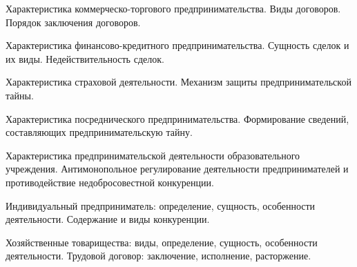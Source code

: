 \documentclass[
	14pt,
	a4paper,
	]
	{scrartcl}
\begin{document}
\shapk
{}
\setcounter{zad}{0}

\vfill
\z Характеристика коммерческо-торгового предпринимательства.
 \vfill
\z Виды договоров. Порядок заключения договоров.
 \vfill

\vfill

\newpage


\shapk
{}
\setcounter{zad}{0}

\vfill
\z Характеристика финансово-кредитного предпринимательства.
 \vfill
\z Сущность сделок и их виды. Недействительность сделок.
 \vfill

\vfill

\newpage


\shapk
{}
\setcounter{zad}{0}

\vfill
\z Характеристика страховой деятельности.
 \vfill
\z Механизм защиты предпринимательской тайны.
 \vfill

\vfill

\newpage


\shapk
{}
\setcounter{zad}{0}

\vfill
\z Характеристика посреднического предпринимательства.
 \vfill
\z Формирование сведений, составляющих предпринимательскую тайну.
 \vfill

\vfill

\newpage


\shapk
{}
\setcounter{zad}{0}

\vfill
\z Характеристика предпринимательской деятельности образовательного учреждения.
 \vfill
\z Антимонопольное регулирование деятельности предпринимателей и противодействие недобросовестной конкуренции.
 \vfill

\vfill

\newpage


\shapk
{}
\setcounter{zad}{0}

\vfill
\z Индивидуальный предприниматель: определение, сущность, особенности деятельности.
 \vfill
\z Содержание и виды конкуренции.
 \vfill

\vfill

\newpage


\shapk
{}
\setcounter{zad}{0}

\vfill
\z Хозяйственные товарищества: виды, определение, сущность, особенности деятельности.
 \vfill
\z Трудовой договор: заключение, исполнение, расторжение.
 \vfill
\end{document}
